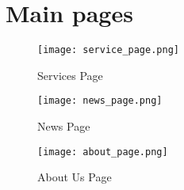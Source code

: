 %
%
%                 

\chapter{Main pages}
\label{sec:appendixa}

\begin{figure}[h]
	\centering 
	\texttt{[image: service\_page.png]}
	\caption{Services Page}
	\label{fig:service_page}
\end{figure}

\begin{figure}[h]
	\centering 
	\texttt{[image: news\_page.png]}
	\caption{News Page}
	\label{fig:news_page}
\end{figure}

\begin{figure}[h]
	\centering 
	\texttt{[image: about\_page.png]}
	\caption{About Us Page}
	\label{fig:anout_page}
\end{figure}


%

